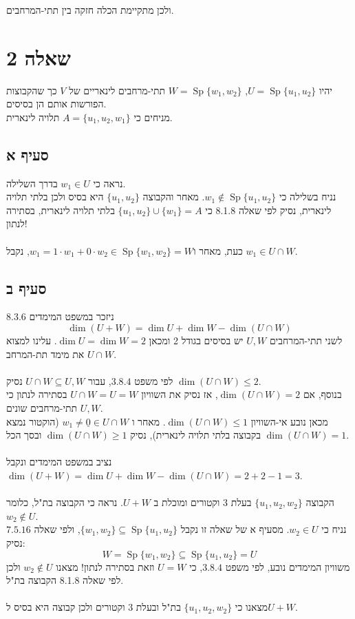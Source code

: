 \documentclass{article}
\DeclareMathOperator\Sp{Sp}
\def\zerovec{\underline{0}}
\begin{document}
ולכן מתקיימת הכלה חזקה בין תתי-המרחבים.

\pagebreak

\section*{שאלה 2}

יהיו $U=\Sp\{u_1, u_2\}$, $W=\Sp\{ w_1, w_2\}$ תתי-מרחבים לינאריים של $V$ כך שהקבוצות הפורשות אותם הן בסיסים.\\
מניחים כי $A=\{ u_1, u_2, w_1 \}$ תלויה לינארית.

\subsection*{סעיף א}

נראה כי $w_1\in U$ בדרך השלילה. \\
נניח בשלילה כי $w_1\notin \Sp\{u_1, u_2\}$.
מאחר והקבוצה $\{ u_1, u_2 \}$ היא בסיס ולכן בלתי תלויה לינארית,
נסיק לפי שאלה 8.1.8 כי $\{ u_1, u_2 \}\cup \{ w_1 \}=A$ בלתי תלויה לינארית, בסתירה לנתון!
\\\\
כעת, מאחר ו$w_1=1\cdot w_1+0\cdot w_2\in \Sp\{ w_1, w_2\}=W$, נקבל $w_1\in U\cap W$.

\subsection*{סעיף ב}

ניזכר במשפט המימדים 8.3.6
\[
    \dim(U+W)=\dim U+\dim W-\dim(U\cap W)
\]
לשני תתי-המרחבים $U,W$ יש בסיסים בגודל 2 ומכאן $\dim U=\dim W=2$. עלינו למצוא את מימד תת-המרחב $U\cap W$.
\\\\
לפי משפט $3.8.4$, עבור $U\cap W\subseteq U, W$ נסיק $\dim(U\cap W)\leq 2$. \\
בנוסף, אם $\dim(U\cap W)=2$, אז נסיק את השוויון $U\cap W=U=W$ בסתירה לנתון כי $U,W$ תתי-מרחבים שונים. \\
מכאן נובע אי-השוויון $\dim(U\cap W)\leq 1$. מאחר ו $w_1\ne \zerovec\in U\cap W$ (הוקטור נמצא בקבוצה בלתי תלויה לינארית),
נסיק $\dim(U\cap W)\geq 1$ ובסך הכל $\dim(U\cap W)=1$.
\\\\
נציב במשפט המימדים ונקבל $\dim(U+W)=\dim U + \dim W - \dim(U\cap W)=2+2-1=3$.
\\\\
הקבוצה $\{u_1, u_2, w_2\}$ בעלת 3 וקטורים ומוכלת ב $U+W$. נראה כי הקבוצה בת"ל, כלומר $w_2\notin U$. \\
נניח כי $w_2\in U$. מסעיף א של שאלה זו נקבל $\{ w_1, w_2\}\subseteq \Sp\{u_1, u_2\}$, ולפי שאלה $7.5.16$ נסיק:
\[
    W=\Sp\{ w_1, w_2\}\subseteq \Sp\{u_1, u_2\}=U
\]
משוויון המימדים נובע, לפי משפט $3.8.4$, כי $U=W$ וזאת בסתירה לנתון! מצאנו $w_2\notin U$ ולכן לפי שאלה 8.1.8 הקבוצה בת"ל.\\\\
מצאנו כי $\{u_1, u_2, w_2\}$ בת"ל ובעלת 3 וקטורים ולכן קבוצה היא בסיס ל$U+W$.
\end{document}
